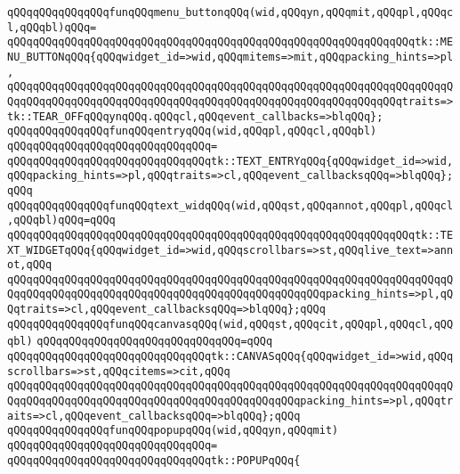 \verb|qQQqqQQqqQQqqQQqfunqQQqmenu_buttonqQQq(wid,qQQqyn,qQQqmit,qQQqpl,qQQqcl,qQQqbl)qQQq=|\newline
\verb|qQQqqQQqqQQqqQQqqQQqqQQqqQQqqQQqqQQqqQQqqQQqqQQqqQQqqQQqqQQqqQQqtk::MENU_BUTTONqQQq{qQQqwidget_id=>wid,qQQqmitems=>mit,qQQqpacking_hints=>pl,|\newline
\verb|qQQqqQQqqQQqqQQqqQQqqQQqqQQqqQQqqQQqqQQqqQQqqQQqqQQqqQQqqQQqqQQqqQQqqQQqqQQqqQQqqQQqqQQqqQQqqQQqqQQqqQQqqQQqqQQqqQQqqQQqqQQqqQQqqQQqtraits=>tk::TEAR_OFFqQQqynqQQq.qQQqcl,qQQqevent_callbacks=>blqQQq};|\newline
\verb|qQQqqQQqqQQqqQQqfunqQQqentryqQQq(wid,qQQqpl,qQQqcl,qQQqbl)|\newline
\verb|qQQqqQQqqQQqqQQqqQQqqQQqqQQqqQQq=|\newline
\verb|qQQqqQQqqQQqqQQqqQQqqQQqqQQqqQQqtk::TEXT_ENTRYqQQq{qQQqwidget_id=>wid,qQQqpacking_hints=>pl,qQQqtraits=>cl,qQQqevent_callbacksqQQq=>blqQQq};qQQq|\newline
\newline
\verb|qQQqqQQqqQQqqQQqfunqQQqtext_widqQQq(wid,qQQqst,qQQqannot,qQQqpl,qQQqcl,qQQqbl)qQQq=qQQq|\newline
\verb|qQQqqQQqqQQqqQQqqQQqqQQqqQQqqQQqqQQqqQQqqQQqqQQqqQQqqQQqqQQqqQQqtk::TEXT_WIDGETqQQq{qQQqwidget_id=>wid,qQQqscrollbars=>st,qQQqlive_text=>annot,qQQq|\newline
\verb|qQQqqQQqqQQqqQQqqQQqqQQqqQQqqQQqqQQqqQQqqQQqqQQqqQQqqQQqqQQqqQQqqQQqqQQqqQQqqQQqqQQqqQQqqQQqqQQqqQQqqQQqqQQqqQQqqQQqqQQqpacking_hints=>pl,qQQqtraits=>cl,qQQqevent_callbacksqQQq=>blqQQq};qQQq|\newline
\newline
\verb|qQQqqQQqqQQqqQQqfunqQQqcanvasqQQq(wid,qQQqst,qQQqcit,qQQqpl,qQQqcl,qQQqbl)|\newline
\verb|qQQqqQQqqQQqqQQqqQQqqQQqqQQqqQQq=qQQq|\newline
\verb|qQQqqQQqqQQqqQQqqQQqqQQqqQQqqQQqtk::CANVASqQQq{qQQqwidget_id=>wid,qQQqscrollbars=>st,qQQqcitems=>cit,qQQq|\newline
\verb|qQQqqQQqqQQqqQQqqQQqqQQqqQQqqQQqqQQqqQQqqQQqqQQqqQQqqQQqqQQqqQQqqQQqqQQqqQQqqQQqqQQqqQQqqQQqqQQqqQQqqQQqqQQqqQQqqQQqpacking_hints=>pl,qQQqtraits=>cl,qQQqevent_callbacksqQQq=>blqQQq};qQQq|\newline
\verb|qQQqqQQqqQQqqQQqfunqQQqpopupqQQq(wid,qQQqyn,qQQqmit)|\newline
\verb|qQQqqQQqqQQqqQQqqQQqqQQqqQQqqQQq=|\newline
\verb|qQQqqQQqqQQqqQQqqQQqqQQqqQQqqQQqtk::POPUPqQQq{|\newline
